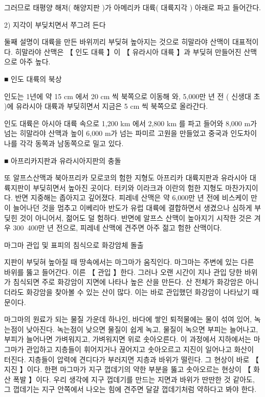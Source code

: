 \documentclass[12pt, a4paper, oneside]{book}
\begin{document}
그러므로 태평양 해저( 해양지판 )가 아메리카 대륙( 대륙지각 ) 아래로 파고 들어간다.



2) 지각이 부딪치면서 쭈그려 든다


둘째 설명이 대륙을 만든 바위끼리 부딪혀 높아지는 것으로 히말라야 산맥이 대표적이다. 히말라야 산맥은 【 인도 대륙 】이 【 유라시아 대륙 】과 부딪혀 만들어진 산맥으로 아주 높다. 




■ 인도 대륙의 북상

인도는 1년에 약 15 cm 에서 20 cm 씩 북쪽으로 이동해 와, 5,000만 년 전 ( 신생대 초 )에 유라시아 대륙과 부딪히면서 지금은 5 cm 씩 북쪽으로 올라간다. 

인도 대륙은 아시아 대륙 속으로 1,200 km 에서 2,800 km 를 파고 들어와 8,000 m가 넘는 히말라야 산맥과 높이 6,000 m가 넘는 파미르 고원을 만들었고 중국과 인도차이나를 각각 동쪽과 남동쪽으로 밀고 있다.


■ 아프리카지판과 유라시아지판의 충돌

또 알프스산맥과 북아프리카 모로코의 험한 지형도 아프리카 대륙지판과 유라시아 대륙지판이 부딪히면서 높아진 곳이다. 터키와 이라크과 이란의 험한 지형도 마찬가지이다. 반면 지중해는 좁아지고 깊어졌다. 피레네 산맥은 약 6,000만 년 전에 비스케이 만이 늘어나던 것을 멈추고 이베리아 반도가 유럽 대륙에 결합하면서 생겼으나 심하게 부딪힌 것이 아니어서, 젊어도 덜 험하다. 반면에 알프스 산맥이 높아지기 시작한 것은 겨우 300~400만 년 전으로, 피레네 산맥에 견주면 아주 젊고 험한 산맥이다.


마그마 관입 및 표피의 침식으로 화강암체 돌출

지판이 부딪혀 높아질 때 땅속에서는 마그마가 움직인다. 마그마는 주변에 있는 다른 바위를 뚫고 들어간다. 이른 【 관입 】한다. 그러나 오랜 시간이 지나 관입 당한 바위가 침식되면 주로 화강암이 지면에 나타나 높은 산을 만든다. 산 전체가 화강암은 아니더라도 화강암을 찾아볼 수 있는 산이 많다. 이는 바로 관입했던 화강암이 나타났기 때문이다.

마그마의 원료가 되는 물질 가운데 하나인, 바다에 쌓인 퇴적물에는 물이 섞여 있어, 녹는점이 낮아진다. 녹는점이 낮으면 물질이 쉽게 녹고, 물질이 녹으면 부피는  늘어나고, 부피가 늘어나면 가벼워지고, 가벼워지면 위로 솟아오른다. 이 과정에서 지하에서는 마그마가 관입하고 지층들이 휘어지거나 끊어지고 솟아오르고 지진이 일어나고 화산이 터진다. 지층들이 압력에 견디다가 부러지면 지층과 바위가 떨린다. 그 현상이 바로 【 지진 】이다. 한편 마그마가 지구 껍데기의 약한 부분을 뚫고 솟아오르는 현상이 【 화산 폭발 】이다. 우리 생각에 지구 껍데기를 만드는 지면과 바위가 딴딴한 것 같아도, 그 껍데기는 지구 안쪽에서 나오는 힘에 견주면 달걀 껍데기처럼 약하다고 봐야 한다.
\end{document}

